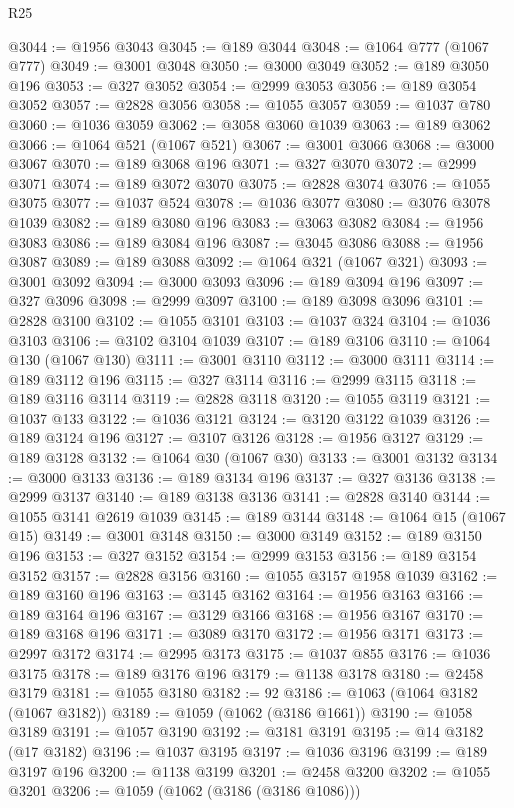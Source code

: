 \begin{lexlean}{R25}
\begin{coremodule}
@3044 := @1956 @3043
@3045 := @189 @3044
@3048 := @1064 @777 (@1067 @777)
@3049 := @3001 @3048
@3050 := @3000 @3049
@3052 := @189 @3050 @196
@3053 := @327 @3052
@3054 := @2999 @3053
@3056 := @189 @3054 @3052
@3057 := @2828 @3056
@3058 := @1055 @3057
@3059 := @1037 @780
@3060 := @1036 @3059
@3062 := @3058 @3060 @1039
@3063 := @189 @3062
@3066 := @1064 @521 (@1067 @521)
@3067 := @3001 @3066
@3068 := @3000 @3067
@3070 := @189 @3068 @196
@3071 := @327 @3070
@3072 := @2999 @3071
@3074 := @189 @3072 @3070
@3075 := @2828 @3074
@3076 := @1055 @3075
@3077 := @1037 @524
@3078 := @1036 @3077
@3080 := @3076 @3078 @1039
@3082 := @189 @3080 @196
@3083 := @3063 @3082
@3084 := @1956 @3083
@3086 := @189 @3084 @196
@3087 := @3045 @3086
@3088 := @1956 @3087
@3089 := @189 @3088
@3092 := @1064 @321 (@1067 @321)
@3093 := @3001 @3092
@3094 := @3000 @3093
@3096 := @189 @3094 @196
@3097 := @327 @3096
@3098 := @2999 @3097
@3100 := @189 @3098 @3096
@3101 := @2828 @3100
@3102 := @1055 @3101
@3103 := @1037 @324
@3104 := @1036 @3103
@3106 := @3102 @3104 @1039
@3107 := @189 @3106
@3110 := @1064 @130 (@1067 @130)
@3111 := @3001 @3110
@3112 := @3000 @3111
@3114 := @189 @3112 @196
@3115 := @327 @3114
@3116 := @2999 @3115
@3118 := @189 @3116 @3114
@3119 := @2828 @3118
@3120 := @1055 @3119
@3121 := @1037 @133
@3122 := @1036 @3121
@3124 := @3120 @3122 @1039
@3126 := @189 @3124 @196
@3127 := @3107 @3126
@3128 := @1956 @3127
@3129 := @189 @3128
@3132 := @1064 @30 (@1067 @30)
@3133 := @3001 @3132
@3134 := @3000 @3133
@3136 := @189 @3134 @196
@3137 := @327 @3136
@3138 := @2999 @3137
@3140 := @189 @3138 @3136
@3141 := @2828 @3140
@3144 := @1055 @3141 @2619 @1039
@3145 := @189 @3144
@3148 := @1064 @15 (@1067 @15)
@3149 := @3001 @3148
@3150 := @3000 @3149
@3152 := @189 @3150 @196
@3153 := @327 @3152
@3154 := @2999 @3153
@3156 := @189 @3154 @3152
@3157 := @2828 @3156
@3160 := @1055 @3157 @1958 @1039
@3162 := @189 @3160 @196
@3163 := @3145 @3162
@3164 := @1956 @3163
@3166 := @189 @3164 @196
@3167 := @3129 @3166
@3168 := @1956 @3167
@3170 := @189 @3168 @196
@3171 := @3089 @3170
@3172 := @1956 @3171
@3173 := @2997 @3172
@3174 := @2995 @3173
@3175 := @1037 @855
@3176 := @1036 @3175
@3178 := @189 @3176 @196
@3179 := @1138 @3178
@3180 := @2458 @3179
@3181 := @1055 @3180
@3182 := 92
@3186 := @1063 (@1064 @3182 (@1067 @3182))
@3189 := @1059 (@1062 (@3186 @1661))
@3190 := @1058 @3189
@3191 := @1057 @3190
@3192 := @3181 @3191
@3195 := @14 @3182 (@17 @3182)
@3196 := @1037 @3195
@3197 := @1036 @3196
@3199 := @189 @3197 @196
@3200 := @1138 @3199
@3201 := @2458 @3200
@3202 := @1055 @3201
@3206 := @1059 (@1062 (@3186 (@3186 @1086)))

\end{coremodule}
\end{lexlean}

